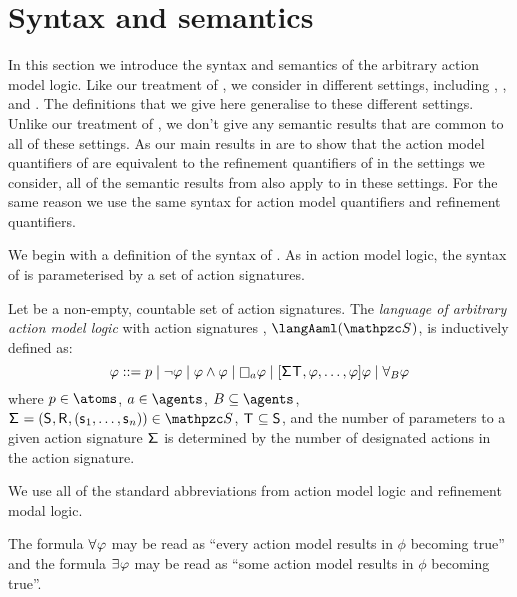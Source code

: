 \section{Syntax and semantics}\label{aaml-semantics}

In this section we introduce the syntax and semantics of the arbitrary action model logic.
Like our treatment of \logicRml{}, we consider \logicAaml{} in different settings, including \classK{}, \classKFF{}, and \classS{}.
The definitions that we give here generalise to these different settings.
Unlike our treatment of \logicRml{}, we don't give any semantic results that are common to all of these settings.
As our main results in \logicAaml{} are to show that the action model quantifiers of \logicAaml{} are equivalent to the refinement quantifiers of \logicRml{} in the settings we consider, all of the semantic results from \logicRml{} also apply to \logicAaml{} in these settings.
For the same reason we use the same syntax for action model quantifiers and refinement quantifiers.

We begin with a definition of the syntax of \logicAaml{}.
As in action model logic, the syntax of \logicAaml{} is parameterised by a set of action signatures.

\begin{definition}
Let \aSignatureFamily{} be a non-empty, countable set of action signatures.
The {\em language of arbitrary action model logic} with action signatures \aSignatureFamily{}, $\langAaml(\aSignatureFamily)$, is inductively defined as:
$$
\phi ::= 
    \atomP \mid
    \lnot \phi \mid
    \phi \land \phi \mid
    \necessaryA \phi \mid
    \actionA{\aSignature \aStatesT, \phi, \dots, \phi} \phi \mid
    \allactsBs \phi
$$
where $\atomP \in \atoms$, $\agentA \in \agents$, $\agentsB \subseteq \agents$, $\aSignatureAndTuple \in \aSignatureFamily$, $\aStatesT \subseteq \aStates$, and the number of parameters to a given action signature $\aSignature$ is determined by the number of designated actions in the action signature.
\end{definition}

We use all of the standard abbreviations from action model logic and refinement modal logic.

The formula $\allacts \phi$ may be read as ``every action model results in $\phi$ becoming true'' and the formula $\someacts \phi$ may be read as ``some action model results in $\phi$ becoming true''.

